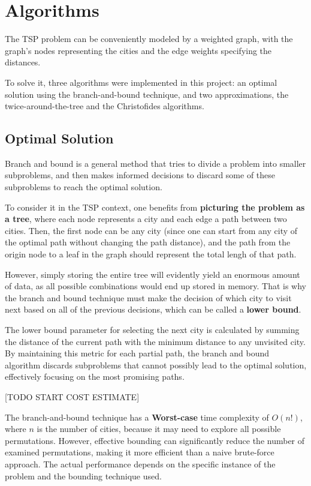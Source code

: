 \documentclass[12pt]{article}
\begin{document}
\section{Algorithms} \label{sec:algorithms}

The TSP problem can be conveniently modeled by a weighted graph, with the graph's 
nodes representing the cities and the edge weights specifying the distances.

To solve it, three algorithms were implemented in this project: an optimal solution using 
the branch-and-bound technique, and two approximations, the twice-around-the-tree and the 
Christofides algorithms.

\subsection{Optimal Solution} \label{sec:optimal_explanation}

Branch and bound is a general method that tries to divide a problem into smaller subproblems,
and then makes informed decisions to discard some of these subproblems to reach the optimal solution.

To consider it in the TSP context, one benefits from \textbf{picturing the problem as a tree}, where each node 
represents a city and each edge a path between two cities. Then, the first node can be any city 
(since one can start from any city of the optimal path without changing the path distance), and 
the path from the origin node to a leaf in the graph should represent the total 
lengh of that path.

However, simply storing the entire tree will evidently yield an enormous amount 
of data, as all possible combinations would end up stored in memory. That is why the 
branch and bound technique must make the decision of which city to visit next based 
on all of the previous decisions, which can be called a \textbf{lower bound}.

The lower bound parameter for selecting the next city is calculated by summing the 
distance of the current path with the minimum distance to any unvisited city. By 
maintaining this metric for each partial path, the branch and bound algorithm 
discards subproblems that cannot possibly lead to the optimal solution, effectively 
focusing on the most promising paths.

[TODO START COST ESTIMATE]

The branch-and-bound technique has a \textbf{Worst-case} time complexity of $O(n!)$, 
where $n$ is the number of cities, because it may need to explore all possible permutations. 
However, effective bounding can significantly reduce the number of examined permutations, 
making it more efficient than a naive brute-force approach. The actual performance depends on 
the specific instance of the problem and the bounding technique used.
\end{document}
